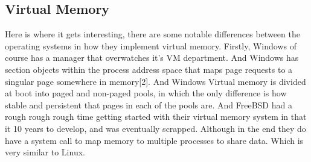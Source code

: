 \documentclass{article}
\begin{document}
\subsection{Virtual Memory}
	Here is where it gets interesting, there are some notable differences between the operating systems in how they implement virtual memory. Firstly, Windows of course has a manager that overwatches it’s VM department. And Windows has section objects within the process address space that maps page requests to a singular page somewhere in memory[2]. And Windows Virtual memory is divided at boot into paged and non-paged pools, in which the only difference is how stable and persistent that pages in each of the pools are. And FreeBSD had a rough rough rough time getting started with their virtual memory system in that it 10 years to develop, and was eventually scrapped. Although in the end they do have a system call to map memory to multiple processes to share data. Which is very similar to Linux.
\end{document}
